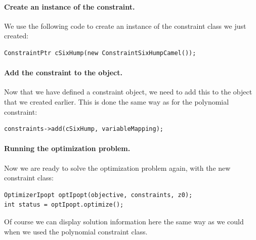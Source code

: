 \paragraph{Create an instance of the constraint.} We use the following code to create an instance of the constraint class we just created:
\begin{lstlisting}
ConstraintPtr cSixHump(new ConstraintSixHumpCamel());
\end{lstlisting}

\paragraph{Add the constraint to the  object.} Now that we have defined a constraint object, we need to add this to the  object that we created earlier. This is done the same way as for the polynomial constraint: 
\begin{lstlisting}
constraints->add(cSixHump, variableMapping);
\end{lstlisting}

\paragraph{Running the optimization problem.} Now we are ready to solve the optimization problem again, with the new constraint class:
\begin{lstlisting}
OptimizerIpopt optIpopt(objective, constraints, z0);
int status = optIpopt.optimize();
\end{lstlisting}
Of course we can display solution information here the same way as we could when we used the polynomial constraint class.

